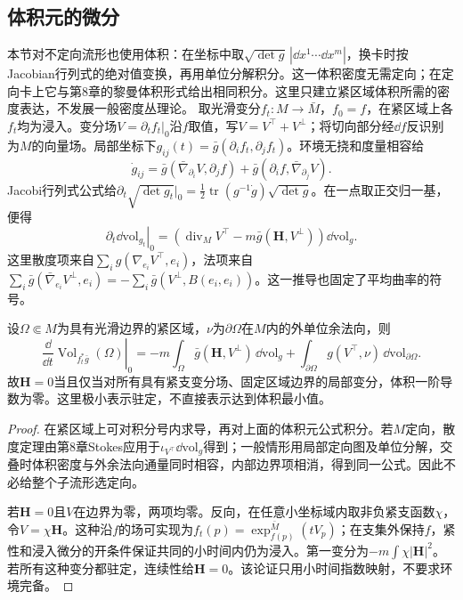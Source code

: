 \subsection*{体积元的微分}
本节对不定向流形也使用体积：在坐标中取$\sqrt{\det g}\,|\dd x^1\cdots\dd x^m|$，换卡时按Jacobian行列式的绝对值变换，再用单位分解积分。这一体积密度无需定向；在定向卡上它与第8章的黎曼体积形式给出相同积分。这里只建立紧区域体积所需的密度表达，不发展一般密度丛理论。
取光滑变分$f_t:M\to\bar M$，$f_0=f$，在紧区域上各$f_t$均为浸入。变分场$V=\partial_tf_t|_0$沿$f$取值，写$V=V^\top+V^\perp$；将切向部分经$\dd f$反识别为$M$的向量场。局部坐标下$g_{ij}(t)=\bar g(\partial_if_t,\partial_jf_t)$。环境无挠和度量相容给
\[
 \dot g_{ij}=\bar g(\bar\nabla_{\partial_i}V,\partial_jf)
             +\bar g(\partial_if,\bar\nabla_{\partial_j}V).
\]
Jacobi行列式公式给$\partial_t\sqrt{\det g_t}|_0=\tfrac12\operatorname{tr}(g^{-1}\dot g)\sqrt{\det g}$。在一点取正交归一基，便得
\[
 \left.\partial_t\dd\mathrm{vol}_{g_t}\right|_0
 =\left(\operatorname{div}_M V^\top-m\bar g(\mathbf H,V^\perp)\right)
   \dd\mathrm{vol}_g.
\]
这里散度项来自$\sum_i g(\nabla_{e_i}V^\top,e_i)$，法项来自
$\sum_i\bar g(\bar\nabla_{e_i}V^\perp,e_i)=-\sum_i\bar g(V^\perp,B(e_i,e_i))$。这一推导也固定了平均曲率的符号。

\begin{theorem}[体积第一变分与极小性]\label{thm:first-volume-variation}
设$\Omega\Subset M$为具有光滑边界的紧区域，$\nu$为$\partial\Omega$在$M$内的外单位余法向，则
\[
 \left.\frac{\dd}{\dd t}\operatorname{Vol}_{f_t^*\bar g}(\Omega)\right|_0
 =-m\int_\Omega\bar g(\mathbf H,V^\perp)\,\dd\mathrm{vol}_g
   +\int_{\partial\Omega}g(V^\top,\nu)\,\dd\mathrm{vol}_{\partial\Omega}.
\]
故$\mathbf H=0$当且仅当对所有具有紧支变分场、固定区域边界的局部变分，体积一阶导数为零。这里极小表示驻定，不直接表示达到体积最小值。
\end{theorem}
\begin{proof}
在紧区域上可对积分号内求导，再对上面的体积元公式积分。若$M$定向，散度定理由第8章Stokes应用于$\iota_{V^\top}\dd\mathrm{vol}_g$得到；一般情形用局部定向图及单位分解，交叠时体积密度与外余法向通量同时相容，内部边界项相消，得到同一公式。因此不必给整个子流形选定向。

若$\mathbf H=0$且$V$在边界为零，两项均零。反向，在任意小坐标域内取非负紧支函数$\chi$，令$V=\chi\mathbf H$。这种沿$f$的场可实现为$f_t(p)=\exp_{f(p)}^{\bar M}(tV_p)$；在支集外保持$f$，紧性和浸入微分的开条件保证共同的小时间内仍为浸入。第一变分为$-m\int\chi|\mathbf H|^2$。若所有这种变分都驻定，连续性给$\mathbf H=0$。该论证只用小时间指数映射，不要求环境完备。
\end{proof}

